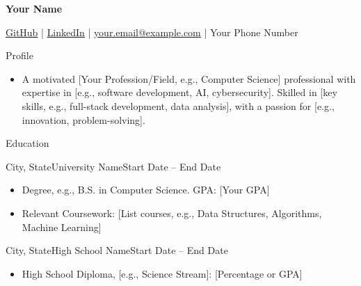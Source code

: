 \documentclass[]{mcdowellcv_3}%
\begin{document}
\begin{center}
    \LARGE{\textbf{Your Name}}
\end{center}
\vspace{-1.5mm}
\begin{center}
    \small{\href{https://github.com/yourprofile}{\faGithub \hspace{0.2mm} GitHub} | \href{https://www.linkedin.com/in/yourprofile/}{\faLinkedinSquare \hspace{0.2mm} LinkedIn} | \href{mailto:your.email@example.com}{\faSend \hspace{0.2mm} your.email@example.com} | \faPhone \hspace{0.2mm} Your Phone Number}
\end{center}
\vspace{-3mm}

\begin{cvsection}{Profile}
    \begin{cvsubsection}{}{}{}
        \begin{itemize}
            \item A motivated [Your Profession/Field, e.g., Computer Science] professional with expertise in [e.g., software development, AI, cybersecurity]. Skilled in [key skills, e.g., full-stack development, data analysis], with a passion for [e.g., innovation, problem-solving].
        \end{itemize}
    \end{cvsubsection}
\end{cvsection}

\begin{cvsection}{Education}
    \begin{cvsubsection}{City, State}{University Name}{Start Date -- End Date}
        \begin{itemize}
            \item Degree, e.g., B.S. in Computer Science. GPA: [Your GPA]
            \item Relevant Coursework: [List courses, e.g., Data Structures, Algorithms, Machine Learning]
        \end{itemize}
    \end{cvsubsection}
    \begin{cvsubsection}{City, State}{High School Name}{Start Date -- End Date}
        \begin{itemize}
            \item High School Diploma, [e.g., Science Stream]: [Percentage or GPA]
        \end{itemize}
    \end{cvsubsection}
\end{cvsection}
\end{document}

